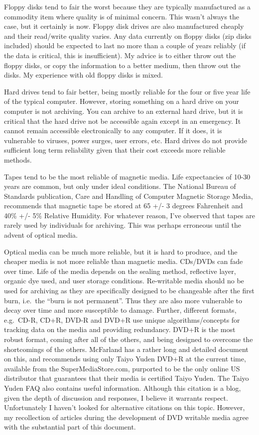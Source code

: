 \documentclass[a4paper]{article}
\begin{document}
Floppy disks tend to fair the worst because they are typically
manufactured as a commodity item where quality is of minimal concern.
This wasn't always the case, but it certainly is now. Floppy disk drives
are also manufactured cheaply and their read/write quality varies. Any
data currently on floppy disks (zip disks included) should be expected
to last no more than a couple of years reliably (if the data is
critical, this is insufficient). My advice is to either throw out the
floppy disks, or copy the information to a better medium, then throw out
the disks. My experience with old floppy disks is mixed.

Hard drives tend to fair better, being mostly reliable for the four or
five year life of the typical computer. However, storing something on a
hard drive on your computer is not archiving. You can archive to an
external hard drive, but it is critical that the hard drive not be
accessible again except in an emergency. It cannot remain accessible
electronically to any computer. If it does, it is vulnerable to viruses,
power surges, user errors, etc. Hard drives do not provide sufficient
long term reliability given that their cost exceeds more reliable
methods.

Tapes tend to be the most reliable of magnetic media. Life expectancies
of 10-30 years are common, but only under ideal conditions. The National
Bureau of Standards publication, Care and Handling of Computer Magnetic
Storage Media, recommends that magnetic tape be stored at 65 +/- 3
degrees Fahrenheit and 40\% +/- 5\% Relative Humidity. For whatever
reason, I’ve observed that tapes are rarely used by individuals for
archiving. This was perhaps erroneous until the advent of optical media.

Optical media can be much more reliable, but it is hard to produce, and
the cheaper media is not more reliable than magnetic media. CDs/DVDs can
fade over time. Life of the media depends on the sealing method,
reflective layer, organic dye used, and user storage conditions.
Re-writable media should no be used for archiving as they are
specifically designed to be changeable after the first burn, i.e.~the
“burn is not permanent”. Thus they are also more vulnerable to decay
over time and more susceptible to damage. Further, different formats,
e.g.~CD-R, CD+R, DVD-R and DVD+R use unique algorithms/concepts for
tracking data on the media and providing redundancy. DVD+R is the most
robust format, coming after all of the others, and being designed to
overcome the shortcomings of the others. McFarland has a rather long and
detailed document on this, and recommends using only Taiyo Yuden DVD+R
at the current time, available from the SuperMediaStore.com, purported
to be the only online US distributor that guarantees that their media is
certified Taiyo Yuden. The Taiyo Yuden FAQ also contains useful
information. Although this citation is a blog, given the depth of
discussion and responses, I believe it warrants respect. Unfortunately I
haven't looked for alternative citations on this topic. However, my
recollection of articles during the development of DVD writable media
agree with the substantial part of this document.
\end{document}
